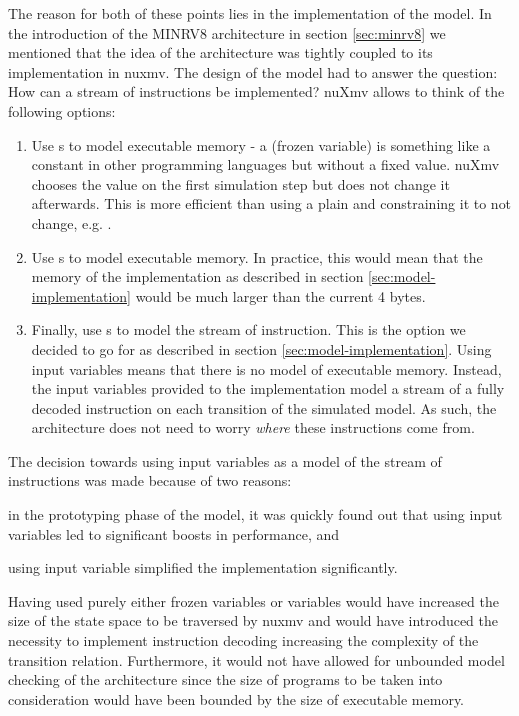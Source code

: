 The reason for both of these points lies in the implementation of the model.
In the introduction of the MINRV8 architecture in section \ref{sec:minrv8} we mentioned that the idea of the architecture was tightly coupled to its implementation in \gls{nuxmv}.
The design of the model had to answer the question: How can a stream of instructions be implemented?
nuXmv allows to think of the following options:
\begin{enumerate}
    \item \label{itm:exmem-frozen}
    Use s to model executable memory - a  (frozen variable) is something like a constant in other programming languages but without a fixed value.
    nuXmv chooses the value on the first simulation step but does not change it afterwards.
    This is more efficient than using a plain  and constraining it to not change, e.g. .
    \item \label{itm:exmem-var}
    Use s to model executable memory.
    In practice, this would mean that the memory of the implementation as described in section \ref{sec:model-implementation} would be much larger than the current 4 bytes.
    \item \label{itm:exmem-ivar}
    Finally, use s to model the stream of instruction.
    This is the option we decided to go for as described in section \ref{sec:model-implementation}.
    Using input variables means that there is no model of executable memory.
    Instead, the input variables provided to the implementation model a stream of a fully decoded instruction on each transition of the simulated model.
    As such, the architecture does not need to worry \textit{where} these instructions come from.
\end{enumerate}

The decision towards using input variables as a model of the stream of instructions was made because of two reasons:
\begin{enumerate*}[label=\alph*)]
    \item in the prototyping phase of the model, it was quickly found out that using input variables led to significant boosts in performance, and
    \item using input variable simplified the implementation significantly.
\end{enumerate*}
Having used purely either frozen variables or variables would have increased the size of the state space to be traversed by \gls{nuxmv} and would have introduced the necessity to implement instruction decoding increasing the complexity of the transition relation.
Furthermore, it would not have allowed for unbounded model checking of the architecture since the size of programs to be taken into consideration would have been bounded by the size of executable memory.

